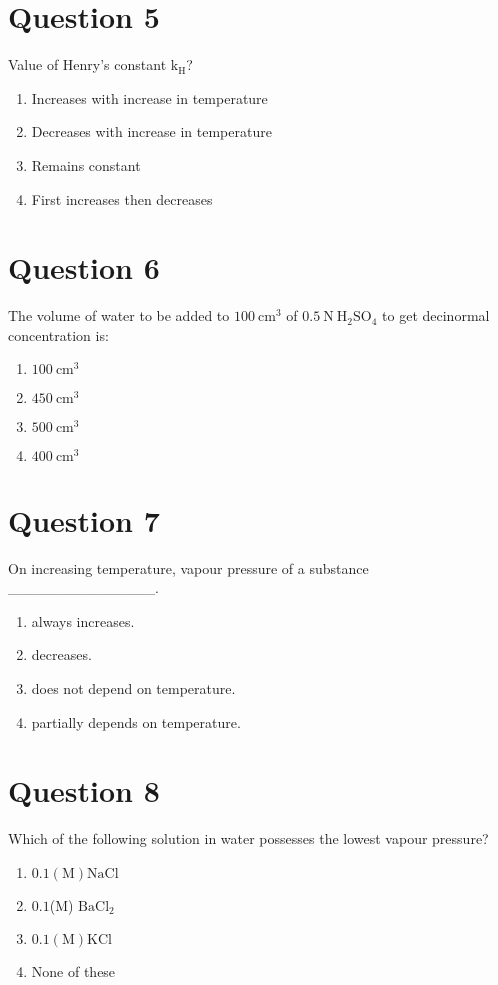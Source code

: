 \documentclass{article}
\begin{document}
\section*{Question 5}
Value of Henry's constant \(\mathrm{k_H}\)?\newline
\begin{enumerate}[label=(\alph*)]
\item Increases with increase in temperature
\item Decreases with increase in temperature
\item Remains constant
\item First increases then decreases
\end{enumerate}
\newpage
\section*{Question 6}
The volume of water to be added to \(100 \mathrm{~cm}^3\) of \(0.5 \mathrm{~N}~ \mathrm{H}_2 \mathrm{SO}_4\) to get decinormal concentration is:
\begin{enumerate}[label=(\alph*)]
\item \(100 \mathrm{~cm}^3\)
\item \(450 \mathrm{~cm}^3\)
\item \(500 \mathrm{~cm}^3\)
\item \(400 \mathrm{~cm}^3\)
\end{enumerate}
\newpage
\section*{Question 7}
On increasing temperature, vapour pressure of a substance ______________.
\begin{enumerate}[label=(\alph*)]
\item always increases.
\item decreases.
\item does not depend on temperature.
\item partially depends on temperature.
\end{enumerate}
\newpage
\section*{Question 8}
Which of the following solution in water possesses the lowest vapour pressure?
\begin{enumerate}[label=(\alph*)]
\item \(0.1(\mathrm{M}) \mathrm{NaCl}\)
\item \(0.1\)(M) \(\mathrm{BaCl}_2\)
\item \(0.1(\mathrm{M}) \mathrm{KCl}\)
\item None of these
\end{enumerate}
\newpage
\end{document}
